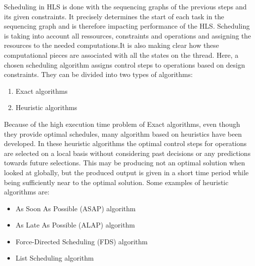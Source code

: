 \documentclass[conference]{IEEEtran}
\begin{document}
Scheduling in HLS is done with the sequencing graphs of the previous steps and its given constraints\cite{SynthesisAndOptimization}. It precisely determines the start of each task in the sequencing graph and is therefore impacting performance of the HLS\cite{SynthesisAndOptimization}. Scheduling is taking into account all ressources, constraints and operations and assigning the resources to the needed computations\cite{ElectronicDesignAutomation}.It is also making clear how these computational pieces are associated with all the states on the thread\cite{ElectronicDesignAutomation}. Here, a chosen scheduling algorithm assigns control steps to operations based on design constraints.\cite{HandbookHWSWCodesign} They can be divided into two types of algorithms:
\begin{enumerate}
    \item Exact algorithms
    \item Heuristic algorithms\\
    
\end{enumerate}

Because of the high execution time problem of Exact algorithms, even though they provide optimal schedules, many algorithm based on heuristics have been developed. In these heuristic algorithms the optimal control steps for operations are selected on a local basis without considering past decisions or any predictions towards future selections\cite{HandbookHWSWCodesign}. This may be producing not an optimal solution when looked at globally, but the produced output is given in a short time period while being sufficiently near to the optimal solution\cite{HandbookHWSWCodesign}. Some examples of heuristic algorithms are:
\begin{itemize}
    \item As Soon As Possible (ASAP) algorithm\cite{HandbookHWSWCodesign}
    \item As Late As Possible (ALAP) algorithm\cite{HandbookHWSWCodesign}
    \item Force-Directed Scheduling (FDS) algorithm\cite{HandbookHWSWCodesign}
    \item List Scheduling algorithm\cite{HandbookHWSWCodesign}
\end{itemize}
\end{document}

